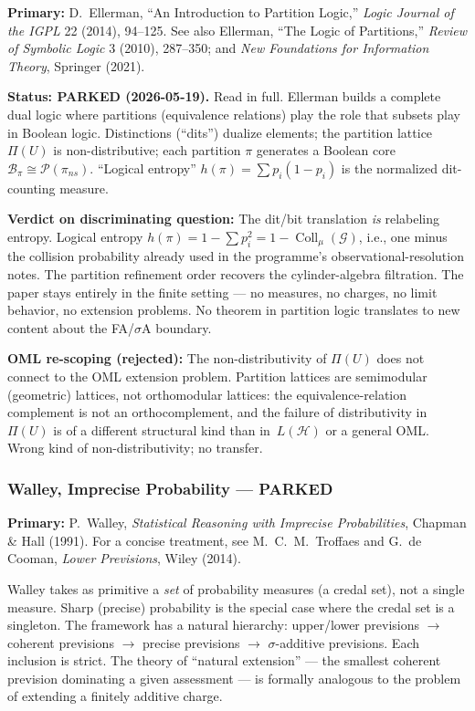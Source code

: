 \noindent\textbf{Primary:} D.~Ellerman, ``An Introduction to
Partition Logic,'' \emph{Logic Journal of the IGPL} 22 (2014),
94--125.  See also Ellerman, ``The Logic of Partitions,''
\emph{Review of Symbolic Logic} 3 (2010), 287--350; and
\emph{New Foundations for Information Theory}, Springer (2021).

\medskip\noindent
\textbf{Status: PARKED (2026-05-19).}  Read in full.
Ellerman builds a complete dual logic where partitions (equivalence
relations) play the role that subsets play in Boolean logic.
Distinctions (``dits'') dualize elements; the partition lattice
$\Pi(U)$ is non-distributive; each partition $\pi$ generates a
Boolean core $\mathcal{B}_\pi \cong \mathcal{P}(\pi_{ns})$.
``Logical entropy'' $h(\pi) = \sum p_i(1-p_i)$ is the normalized
dit-counting measure.

\medskip\noindent
\textbf{Verdict on discriminating question:}  The dit/bit translation
\emph{is} relabeling entropy.  Logical entropy $h(\pi) = 1 -
\sum p_i^2 = 1 - \operatorname{Coll}_\mu(\mathcal{G})$, i.e., one
minus the collision probability already used in the programme's
observational-resolution notes.  The partition refinement order
recovers the cylinder-algebra filtration.  The paper stays entirely
in the finite setting --- no measures, no charges, no limit behavior,
no extension problems.  No theorem in partition logic translates to
new content about the FA/$\sigma$A boundary.

\medskip\noindent
\textbf{OML re-scoping (rejected):}  The non-distributivity of
$\Pi(U)$ does not connect to the OML extension problem.  Partition
lattices are semimodular (geometric) lattices, not orthomodular
lattices: the equivalence-relation complement is not an
orthocomplement, and the failure of distributivity in $\Pi(U)$ is
of a different structural kind than in~$L(\mathcal{H})$ or a
general OML\@.  Wrong kind of non-distributivity; no transfer.

\subsubsection*{Walley, Imprecise Probability --- PARKED}

\noindent\textbf{Primary:} P.~Walley, \emph{Statistical Reasoning
with Imprecise Probabilities}, Chapman \& Hall (1991).  For a concise
treatment, see M.~C.~M.~Troffaes and G.~de Cooman, \emph{Lower
Previsions}, Wiley (2014).

\medskip\noindent
Walley takes as primitive a \emph{set} of probability measures (a
credal set), not a single measure.  Sharp (precise) probability is
the special case where the credal set is a singleton.  The framework
has a natural hierarchy: upper/lower previsions $\to$ coherent
previsions $\to$ precise previsions $\to$ $\sigma$-additive previsions.
Each inclusion is strict.  The theory of ``natural extension'' ---
the smallest coherent prevision dominating a given assessment --- is
formally analogous to the problem of extending a finitely additive
charge.


